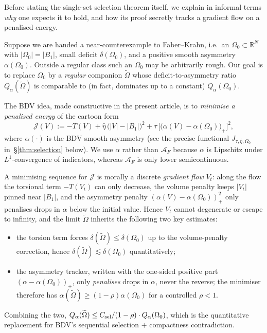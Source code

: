 \documentclass[11pt]{amsart}
\theoremstyle{definition}
\newcommand{\R}{\mathbb R}
\newcommand{\AF}{\mathcal A_F}
\begin{document}
Before stating the single-set selection theorem itself, we explain in
informal terms \emph{why} one expects it to hold, and how its proof
secretly tracks a gradient flow on a penalised energy.

Suppose we are handed a near-counterexample to Faber--Krahn, i.e.\ an
$\Omega_0\subset\R^N$ with $|\Omega_0|=|B_1|$, small deficit
$\delta(\Omega_0)$, and a positive smooth asymmetry
$\alpha(\Omega_0)$.  Outside a regular class such an $\Omega_0$ may
be arbitrarily rough.  Our goal is to replace $\Omega_0$ by a
\emph{regular} companion $\widetilde\Omega$ whose
deficit-to-asymmetry ratio $Q_\alpha(\widetilde\Omega)$ is comparable
to (in fact, dominates up to a constant) $Q_\alpha(\Omega_0)$.

The BDV idea, made constructive in the present article, is to
\emph{minimise a penalised energy} of the cartoon form
\begin{equation}\label{eq:J-cartoon}
   \mathcal{J}(V):=-T(V)+\widehat\eta\,\bigl(|V|-|B_1|\bigr)^{2}
      +\tau\,\bigl[\bigl(\alpha(V)-\alpha(\Omega_0)\bigr)_{+}\bigr]^{2},
\end{equation}
where $\alpha(\cdot)$ is the BDV smooth asymmetry (see the precise
functional $J_{\tau,\widehat\eta,\Omega_0}$
in~\S\ref{thm:selection} below).  We use $\alpha$ rather
than $\AF$ because $\alpha$ is Lipschitz under $L^{1}$-convergence of
indicators, whereas $\AF$ is only lower semicontinuous.

A minimising sequence for $\mathcal{J}$ is morally a discrete
\emph{gradient flow} $V_t$: along the flow the torsional term
$-T(V_t)$ can only decrease, the volume penalty keeps $|V_t|$ pinned
near $|B_1|$, and the asymmetry penalty $(\alpha(V)-\alpha(\Omega_0))
_+^2$ only penalises drops in $\alpha$ below the initial value.  Hence
$V_t$ cannot degenerate or escape to infinity, and the limit
$\widetilde\Omega$ inherits the following two key estimates:

\begin{itemize}[leftmargin=2em]
\item the torsion term forces
$\delta(\widetilde\Omega)\le\delta(\Omega_0)$ up to the volume-penalty
correction, hence $\delta(\widetilde\Omega)\lesssim\delta(\Omega_0)$
quantitatively;
\item the asymmetry tracker, written with the one-sided positive
part $(\alpha-\alpha(\Omega_0))_+$, only \emph{penalises} drops in
$\alpha$, never the reverse; the minimiser therefore has
$\alpha(\widetilde\Omega)\ge(1-\rho)\alpha(\Omega_0)$ for a
controlled $\rho<1$.
\end{itemize}
Combining the two,
\(Q_\alpha(\widetilde\Omega)\le C_{\rm sel}/(1-\rho)\cdot
Q_\alpha(\Omega_0)\), which is the quantitative replacement for BDV's
sequential selection $+$ compactness contradiction.
\end{document}

